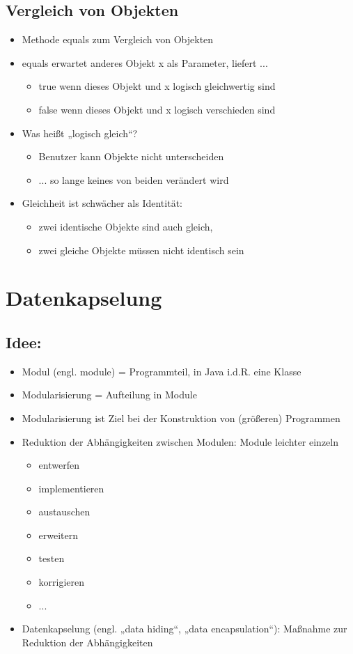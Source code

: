 \subsection{Vergleich von Objekten}
\begin{itemize}
\item Methode equals zum Vergleich von Objekten
\item equals erwartet anderes Objekt x als Parameter, liefert ...
\begin{itemize}
\item true wenn dieses Objekt und x logisch gleichwertig sind
\item false wenn dieses Objekt und x logisch verschieden sind
\end{itemize}
\item Was heißt „logisch gleich“?
\begin{itemize}
\item Benutzer kann Objekte nicht unterscheiden
\item ... so lange keines von beiden verändert wird
\end{itemize}
\item Gleichheit ist schwächer als Identität:
\begin{itemize}
\item zwei identische Objekte sind auch gleich,
\item zwei gleiche Objekte müssen nicht identisch sein
\end{itemize}
\end{itemize}
%
%
%
\section{Datenkapselung}
\subsection{Idee:}
\begin{itemize}
\item Modul (engl. module) = Programmteil, in Java i.d.R. eine Klasse
\item Modularisierung = Aufteilung in Module
\item Modularisierung ist Ziel bei der Konstruktion von (größeren) Programmen
\item Reduktion der Abhängigkeiten zwischen Modulen: Module leichter einzeln
\begin{itemize}
\item entwerfen
\item implementieren
\item austauschen
\item erweitern
\item testen
\item korrigieren
\item ...
\end{itemize}
\item Datenkapselung (engl. „data hiding“, „data encapsulation“): Maßnahme zur Reduktion der Abhängigkeiten
\end{itemize}

